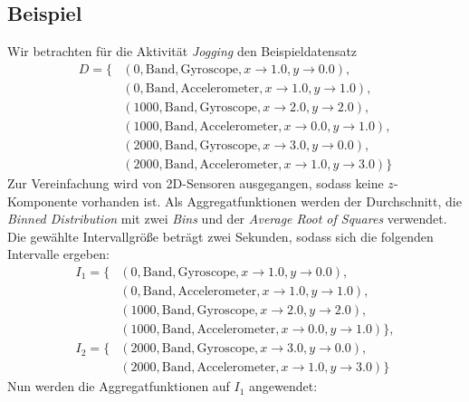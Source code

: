 \subsection{Beispiel}
Wir betrachten für die Aktivität \textit{Jogging} den Beispieldatensatz
\begin{align*}
D = \{&(0, \text{Band}, \text{Gyroscope}, {x \to 1.0, y \to 0.0}), \\
&(0, \text{Band}, \text{Accelerometer}, {x \to 1.0, y \to 1.0}), \\
&(1000, \text{Band}, \text{Gyroscope}, {x \to 2.0, y \to 2.0}), \\
&(1000, \text{Band}, \text{Accelerometer}, {x \to 0.0, y \to 1.0}), \\
&(2000, \text{Band}, \text{Gyroscope}, {x \to 3.0, y \to 0.0}), \\
&(2000, \text{Band}, \text{Accelerometer}, {x \to 1.0, y \to 3.0})\}
\end{align*} 
Zur Vereinfachung wird von 2D-Sensoren ausgegangen, sodass keine $z$-Komponente vorhanden ist. Als Aggregatfunktionen werden der Durchschnitt, die \textit{Binned Distribution} mit zwei \textit{Bins} und der \textit{Average Root of Squares} verwendet. Die gewählte Intervallgröße beträgt zwei Sekunden, sodass sich die folgenden Intervalle ergeben:
\begin{align*}
I_1 = \{&(0, \text{Band}, \text{Gyroscope}, {x \to 1.0, y \to 0.0}), \\
&(0, \text{Band}, \text{Accelerometer}, {x \to 1.0, y \to 1.0}), \\
&(1000, \text{Band}, \text{Gyroscope}, {x \to 2.0, y \to 2.0}), \\
&(1000, \text{Band}, \text{Accelerometer}, {x \to 0.0, y \to 1.0})\}, \\
I_2 = \{&(2000, \text{Band}, \text{Gyroscope}, {x \to 3.0, y \to 0.0}), \\
&(2000, \text{Band}, \text{Accelerometer}, {x \to 1.0, y \to 3.0})\}
\end{align*}
Nun werden die Aggregatfunktionen auf $I_1$ angewendet:

